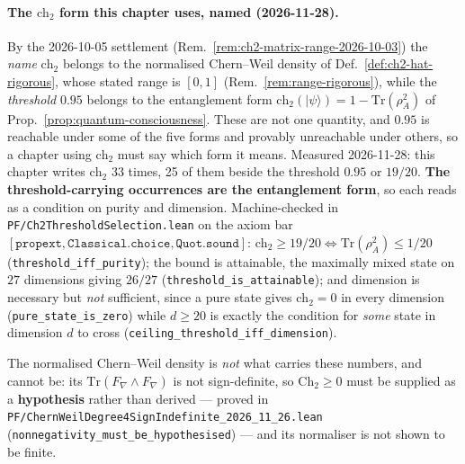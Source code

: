 \paragraph{The $\text{ch}_2$ form this chapter uses, named (2026-11-28).}
By the 2026-10-05 settlement (Rem.~\ref{rem:ch2-matrix-range-2026-10-03}) the
\emph{name} $\text{ch}_2$ belongs to the normalised Chern--Weil density of
Def.~\ref{def:ch2-hat-rigorous}, whose stated range is $[0,1]$
(Rem.~\ref{rem:range-rigorous}), while the \emph{threshold} $0.95$ belongs to the
entanglement form $\text{ch}_2(|\psi\rangle) = 1 - \mathrm{Tr}(\rho_A^2)$ of
Prop.~\ref{prop:quantum-consciousness}. These are not one quantity, and $0.95$ is
reachable under some of the five forms and provably unreachable under others, so a
chapter using $\text{ch}_2$ must say which form it means.
Measured 2026-11-28: this chapter writes $\text{ch}_2$ 33 times, 25 of them
beside the threshold $0.95$ or $19/20$. \textbf{The threshold-carrying occurrences
are the entanglement form}, so each reads as a condition on purity and dimension.
Machine-checked in \texttt{PF/Ch2ThresholdSelection.lean} on the axiom bar
$[\mathtt{propext}, \mathtt{Classical.choice}, \mathtt{Quot.sound}]$:
$\text{ch}_2 \geq 19/20 \iff \mathrm{Tr}(\rho_A^2) \leq 1/20$
(\texttt{threshold\_iff\_purity}); the bound is attainable, the maximally mixed
state on $27$ dimensions giving $26/27$ (\texttt{threshold\_is\_attainable}); and
dimension is necessary but \emph{not} sufficient, since a pure state gives
$\text{ch}_2 = 0$ in every dimension (\texttt{pure\_state\_is\_zero}) while
$d \geq 20$ is exactly the condition for \emph{some} state in dimension $d$ to
cross (\texttt{ceiling\_threshold\_iff\_dimension}).

\noindent The normalised Chern--Weil density is \emph{not} what carries these
numbers, and cannot be: its $\mathrm{Tr}(F_\nabla \wedge F_\nabla)$ is not
sign-definite, so $\mathrm{Ch}_2 \geq 0$ must be supplied as a \textbf{hypothesis}
rather than derived --- proved in
\texttt{PF/ChernWeilDegree4SignIndefinite\_2026\_11\_26.lean}
(\texttt{nonnegativity\_must\_be\_hypothesised}) --- and its normaliser is not
shown to be finite.


